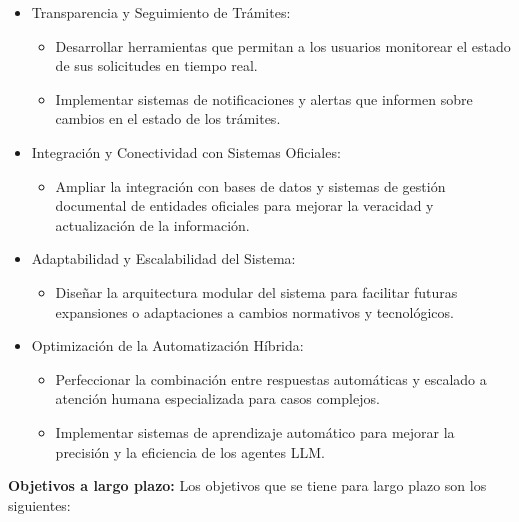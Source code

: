 \begin{itemize}
    \item Transparencia y Seguimiento de Trámites:
    \begin{itemize}
        \item Desarrollar herramientas que permitan a los usuarios monitorear el estado de sus solicitudes en tiempo real.
        \item Implementar sistemas de notificaciones y alertas que informen sobre cambios en el estado de los trámites.
    \end{itemize}
    \item Integración y Conectividad con Sistemas Oficiales:
    \begin{itemize}
        \item Ampliar la integración con bases de datos y sistemas de gestión documental de entidades oficiales para mejorar la veracidad y actualización de la información.
    \end{itemize}
    \item Adaptabilidad y Escalabilidad del Sistema:
    \begin{itemize}
        \item Diseñar la arquitectura modular del sistema para facilitar futuras expansiones o adaptaciones a cambios normativos y tecnológicos.
    \end{itemize}
    \item Optimización de la Automatización Híbrida:
    \begin{itemize}
        \item Perfeccionar la combinación entre respuestas automáticas y escalado a atención humana especializada para casos complejos.
        \item Implementar sistemas de aprendizaje automático para mejorar la precisión y la eficiencia de los agentes LLM.
    \end{itemize}
\end{itemize}

\textbf{Objetivos a largo plazo:}
Los objetivos que se tiene para largo plazo son los siguientes:

